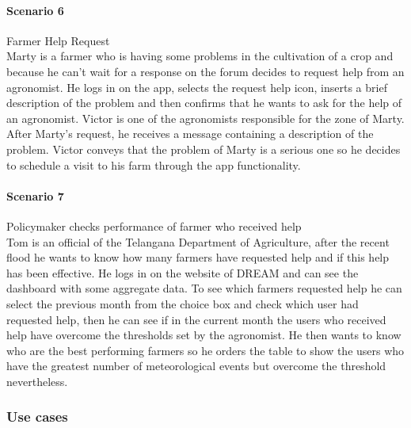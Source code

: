 \paragraph{Scenario 6} Farmer Help Request\\
Marty is a farmer who is having some problems in the cultivation of a crop and because he can't wait for a response on the 
forum decides to request help from an agronomist. He logs in on the app, selects the request help icon, inserts a brief description 
of the problem and then confirms that he wants to ask for the help of an agronomist. Victor is one of the agronomists responsible 
for the zone of Marty. After Marty's request, he receives a message containing a description of the problem. Victor conveys that the 
problem of Marty is a serious one so he decides to schedule a visit to his farm through the app functionality.

\paragraph{Scenario 7} Policymaker checks performance of farmer who received help\\
Tom is an official of the Telangana Department of Agriculture, after the recent flood he wants to know how many farmers have requested 
help and if this help has been effective. He logs in on the website of DREAM and can see the dashboard with some aggregate data. 
To see which farmers requested help he can select the previous month from the choice box and check which user had requested help, 
then he can see if in the current month the users who received help have overcome the thresholds set by the agronomist. He then wants 
to know who are the best performing farmers so he orders the table to show the users who have the greatest number of meteorological 
events but overcome the threshold nevertheless.

\newpage

\subsubsection{Use cases}


